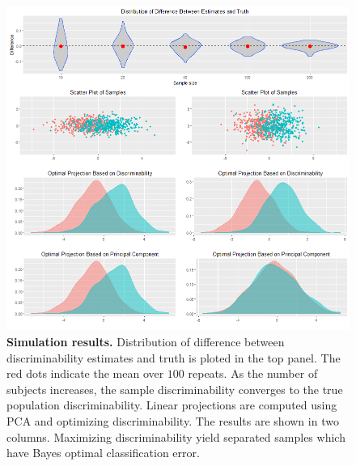\documentclass{article}
\begin{document}
\begin{figure}[ht!]
	\includegraphics[width=\linewidth]{../Figs/comb_simu.png}
	\caption{{\bf Simulation results.} Distribution of difference between discriminability estimates and truth is ploted in the top panel. The red dots indicate the mean over $100$ repeats. As the number of subjects increases, the sample discriminability converges to the true population discriminability. Linear projections are computed using PCA and optimizing discriminability. The results are shown in two columns. Maximizing discriminability yield separated samples which have Bayes optimal classification error.}
	\label{fig:comb_simu}
\end{figure}
\end{document}
